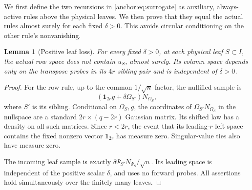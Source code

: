 \documentclass[11pt,oneside,openany,a4paper]{book}
\numberwithin{equation}{chapter}
\newtheorem{lemma}[theorem]{Lemma}
\theoremstyle{definition}
\theoremstyle{remark}
\begin{document}
We first define the two recursions in \eqref{anchor:eq:surrogate} as auxiliary, always-active rules above the physical leaves. We then prove that they equal the actual rules almost surely for each fixed $\delta>0$. This avoids circular conditioning on the other rule's nonvanishing.

\begin{lemma}[Positive leaf loss]\label{anchor:lem:leafloss}
For every fixed $\delta>0$, at each physical leaf $S\subset I$, the actual row space does not contain $u_S$, almost surely. Its column space depends only on the transpose probes in its $4r$ sibling pair and is independent of $\delta>0$.
\end{lemma}
\begin{proof}
For the row rule, up to the common $1/\sqrt n$ factor, the nullified sample is
\[
 (\mathbf1_{2r}g+\delta\Omega_{S'})N_{\Omega_S},
\]
where $S'$ is its sibling. Conditional on $\Omega_S,g$, the coordinates of $\Omega_{S'}N_{\Omega_S}$ in the nullspace are a standard $2r\times(q-2r)$ Gaussian matrix. Its shifted law has a density on all such matrices. Since $r<2r$, the event that its leading-$r$ left space contains the fixed nonzero vector $\mathbf1_{2r}$ has measure zero. Singular-value ties also have measure zero.

The incoming leaf sample is exactly
$\delta\Psi_{S'}N_{\Psi_S}/\sqrt n$. Its leading space is independent of the positive scalar $\delta$, and uses no forward probes. All assertions hold simultaneously over the finitely many leaves.
\end{proof}
\end{document}
